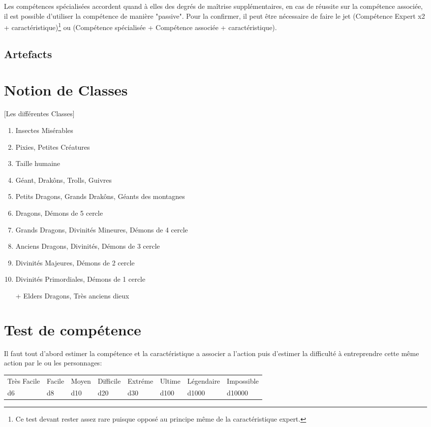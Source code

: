 Les compétences spécialisées accordent quand à elles des degrés de maîtrise supplémentaires, en cas de réussite sur la compétence associée, 
il est possible d'utiliser la compétence de manière "passive". Pour la confirmer, il peut être nécessaire de faire le jet 
(Compétence Expert x2 + caractéristique)\footnote{Ce test devant rester assez rare puisque opposé au principe même de la caractéristique expert.}
 ou (Compétence spécialisée + Compétence associée + caractéristique).

\subsection{Artefacts}
\section{Notion de Classes}
\label{Classes}[Les différentes Classes]
\begin{enumerate}
    \item Insectes Misérables
    \item Pixies, Petites Créatures
    \item Taille humaine
    \item Géant, Drakôns, Trolls, Guivres
    \item Petits Dragons, Grands Drakôns, Géants des montagnes
    \item Dragons, Démons de 5 cercle
    \item Grands Dragons, Divinités Mineures, Démons de 4 cercle
    \item Anciens Dragons, Divinités, Démons de 3 cercle
    \item Divinités Majeures, Démons de 2 cercle
    \item Divinités Primordiales, Démons de 1 cercle
    \item[+] Elders Dragons, Très anciens dieux
\end{enumerate}

\section{Test de compétence}
Il faut tout d'abord estimer la compétence et la caractéristique a associer a l'action puis d'estimer la difficulté à entreprendre cette même action par le ou les personnages:
\begin{center}
\begin{tabular}{llllllll}
Très Facile & Facile & Moyen & Difficile & Extréme & Ultime & Légendaire & Impossible\\
d6 & d8 & d10 & d20 & d30 & d100 & d1000 & d10000
\end{tabular}
\end{center}

